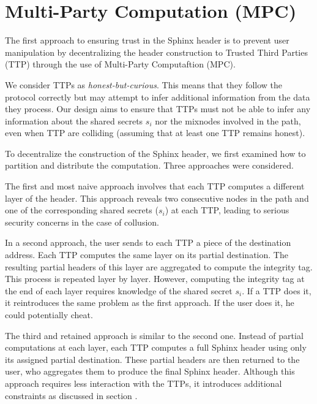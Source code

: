 \newpage
\section{Multi-Party Computation (MPC)}

The first approach to ensuring trust in the Sphinx header is to prevent user manipulation by decentralizing the header construction to Trusted Third Parties (TTP) through the use of Multi-Party Computaftion (MPC).

We consider TTPs as \textit{honest-but-curious}.
This means that they follow the protocol correctly but may attempt to infer additional information from the data they process.
Our design aims to ensure that TTPs must not be able to infer any information about the shared secrets $s_i$ nor the mixnodes involved in the path, even when TTP are colliding (assuming that at least one TTP remains honest).
\newline



To decentralize the construction of the Sphinx header, we first examined how to partition and distribute the computation. 
Three approaches were considered.

The first and most naive approach involves that each TTP computes a different layer of the header. 
This approach reveals two consecutive nodes in the path and one of the corresponding shared secrets ($s_i$) at each TTP, leading to serious security concerns in the case of collusion.

In a second approach, the user sends to each TTP a piece of the destination address.
Each TTP computes the same layer on its partial destination.
The resulting partial headers of this layer are aggregated to compute the integrity tag. 
This process is repeated layer by layer. 
However, computing the integrity tag at the end of each layer requires knowledge of the shared secret $s_i$. 
If a TTP does it, it reintroduces the same problem as the first approach.
If the user does it, he could potentially cheat.

The third and retained approach is similar to the second one.
Instead of partial computations at each layer, each TTP computes a full Sphinx header using only its assigned partial destination. 
These partial headers are then returned to the user, who aggregates them to produce the final Sphinx header.
Although this approach requires less interaction with the TTPs, it introduces additional constraints as discussed in section .

